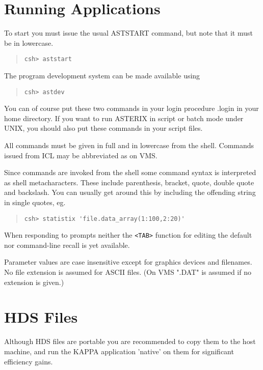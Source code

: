 \documentclass{book}
\renewcommand{\_}{{\tt\char'137}}     %
\begin{document}
\section{Running Applications}
To start you must issue the usual ASTSTART command, but note that
it must be in lowercase.

\begin{quote}\begin{verbatim}
csh> aststart
\end{verbatim}\end{quote}
The program development system can be made available using
\begin{quote}\begin{verbatim}
csh> astdev
\end{verbatim}\end{quote}
You can of course put these two commands in your login procedure
.login in your home directory. If you want to run ASTERIX in
script or batch mode under UNIX, you should also put these
commands in your script files.

All commands must be given in full and in lowercase from the shell.
Commands issued from ICL may be abbreviated as on VMS.

Since commands are invoked from the shell some command syntax is
interpreted as shell metacharacters. These include parenthesis,
bracket, quote, double quote and backslash. You can usually get
around this by including the offending string in single quotes, eg.

\begin{quote}\begin{verbatim}
csh> statistix 'file.data_array(1:100,2:20)'
\end{verbatim}\end{quote}
When responding to prompts neither the \verb+<TAB>+ function for editing
the default nor command-line recall is yet available.

Parameter values are case insensitive except for graphics devices
and filenames. No file extension is assumed for ASCII files. (On
VMS ".DAT" is assumed if no extension is given.)

\section{HDS Files}
Although HDS files are portable you are recommended to copy them to
the host machine, and run the KAPPA application 'native' on them for
significant efficiency gains.
\end{document}
